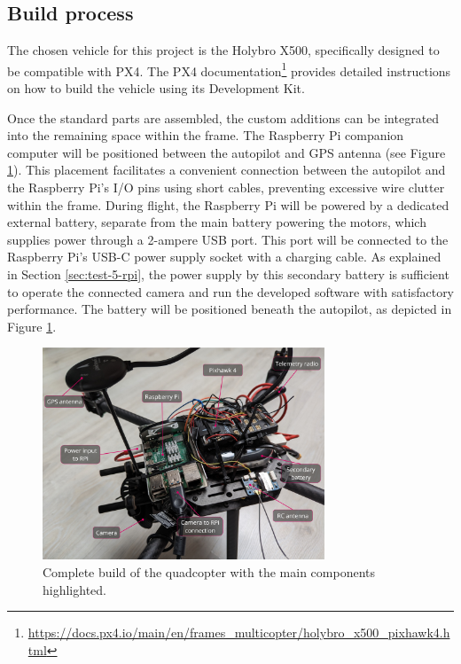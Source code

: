 \subsection{Build process}
\label{sec:test-7-builddrone}

The chosen vehicle for this project is the Holybro X500, specifically designed to be compatible with PX4. The PX4 documentation\footnote{\url{https://docs.px4.io/main/en/frames_multicopter/holybro_x500_pixhawk4.html}} provides detailed instructions on how to build the vehicle using its Development Kit. 

Once the standard parts are assembled, the custom additions can be integrated into the remaining space within the frame. The Raspberry Pi companion computer will be positioned between the autopilot and GPS antenna (see Figure \ref{fig:full-build}). This placement facilitates a convenient connection between the autopilot and the Raspberry Pi's I/O pins using short cables, preventing excessive wire clutter within the frame. During flight, the Raspberry Pi will be powered by a dedicated external battery, separate from the main battery powering the motors, which supplies power through a 2-ampere USB port. This port will be connected to the Raspberry Pi's USB-C power supply socket with a charging cable. As explained in Section \ref{sec:test-5-rpi}, the power supply by this secondary battery is sufficient to operate the connected camera and run the developed software with satisfactory performance. The battery will be positioned beneath the autopilot, as depicted in Figure \ref{fig:full-build}. 


\begin{figure}[H]
  \centering
  \includegraphics[width=0.75\textwidth, keepaspectratio]{img/full-build.jpg}
  \caption{Complete build of the quadcopter with the main components highlighted.}\label{fig:full-build}
\end{figure}


